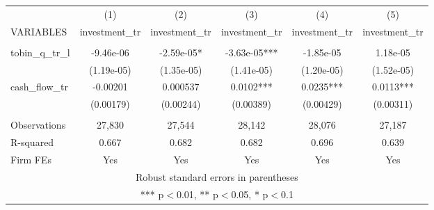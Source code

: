 \begin{tabular}{lccccc} \hline
 & (1) & (2) & (3) & (4) & (5) \\
VARIABLES & investment\_tr & investment\_tr & investment\_tr & investment\_tr & investment\_tr \\ \hline
 &  &  &  &  &  \\
tobin\_q\_tr\_l & -9.46e-06 & -2.59e-05* & -3.63e-05*** & -1.85e-05 & 1.18e-05 \\
 & (1.19e-05) & (1.35e-05) & (1.41e-05) & (1.20e-05) & (1.52e-05) \\
cash\_flow\_tr & -0.00201 & 0.000537 & 0.0102*** & 0.0235*** & 0.0113*** \\
 & (0.00179) & (0.00244) & (0.00389) & (0.00429) & (0.00311) \\
 &  &  &  &  &  \\
Observations & 27,830 & 27,544 & 28,142 & 28,076 & 27,187 \\
R-squared & 0.667 & 0.682 & 0.682 & 0.696 & 0.639 \\
 Firm FEs & Yes & Yes & Yes & Yes & Yes \\ \hline
\multicolumn{6}{c}{ Robust standard errors in parentheses} \\
\multicolumn{6}{c}{ *** p$<$0.01, ** p$<$0.05, * p$<$0.1} \\
\end{tabular}
